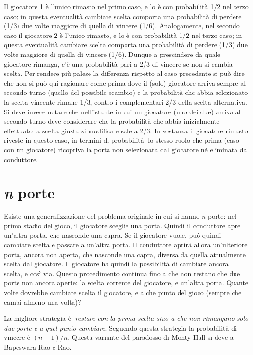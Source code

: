 \documentclass[a4paper, 12pt]{report}
\begin{document}
Il giocatore 1 è l'unico rimasto nel primo caso, e lo è con probabilità 1/2 nel terzo caso; in questa eventualità cambiare scelta comporta una probabilità di perdere (1/3) due volte maggiore di quella di vincere (1/6). Analogamente, nel secondo caso il giocatore 2 è l'unico rimasto, e lo è con probabilità 1/2 nel terzo caso; in questa eventualità cambiare scelta comporta una probabilità di perdere (1/3) due volte maggiore di quella di vincere (1/6). Dunque a prescindere da quale giocatore rimanga, c'è una probabilità pari a 2/3 di vincere se non si cambia scelta. Per rendere più palese la differenza rispetto al caso precedente si può dire che non si può qui ragionare come prima dove il (solo) giocatore arriva sempre al secondo turno (quello del possibile scambio) e la probabilità che abbia selezionato la scelta vincente rimane 1/3, contro i complementari 2/3 della scelta alternativa. Si deve invece notare che nell'istante in cui un giocatore (uno dei due) arriva al secondo turno deve considerare che la probabilità che abbia inizialmente effettuato la scelta giusta si modifica e sale a 2/3. In sostanza il giocatore rimasto riveste in questo caso, in termini di probabilità, lo stesso ruolo che prima (caso con un giocatore) ricopriva la porta non selezionata dal giocatore né eliminata dal conduttore.

\section{\textit{n} porte}
Esiste una generalizzazione del problema originale in cui si hanno \textit{n} porte: nel primo stadio del gioco, il giocatore sceglie una porta. Quindi il conduttore apre un'altra porta, che nasconde una capra. Se il giocatore vuole, può quindi cambiare scelta e passare a un'altra porta. Il conduttore aprirà allora un'ulteriore porta, ancora non aperta, che nasconde una capra, diversa da quella attualmente scelta dal giocatore. Il giocatore ha quindi la possibilità di cambiare ancora scelta, e così via. Questo procedimento continua fino a che non restano che due porte non ancora aperte: la scelta corrente del giocatore, e un'altra porta. Quante volte dovrebbe cambiare scelta il giocatore, e a che punto del gioco (sempre che cambi almeno una volta)?

La migliore strategia è: \textit{restare con la prima scelta sino a che non rimangano solo due porte e a quel punto cambiare}. Seguendo questa strategia la probabilità di vincere è \((n-1)/n\). Questa variante del paradosso di Monty Hall si deve a Bapeswara Rao e Rao.
\end{document}
